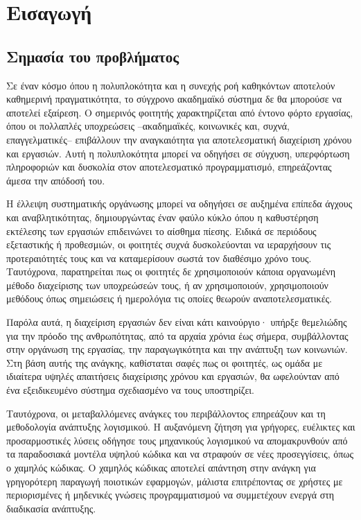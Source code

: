 \chapter{Εισαγωγή}
	\section{Σημασία του προβλήματος}
		Σε έναν κόσμο όπου η πολυπλοκότητα και η συνεχής ροή καθηκόντων αποτελούν καθημερινή πραγματικότητα, το σύγχρονο ακαδημαϊκό σύστημα δε θα μπορούσε να αποτελεί εξαίρεση. Ο σημερινός φοιτητής χαρακτηρίζεται από έντονο φόρτο εργασίας, όπου οι πολλαπλές υποχρεώσεις --ακαδημαϊκές, κοινωνικές και, συχνά, επαγγελματικές-- επιβάλλουν την αναγκαιότητα για αποτελεσματική διαχείριση χρόνου και εργασιών. Αυτή η πολυπλοκότητα μπορεί να οδηγήσει σε σύγχυση, υπερφόρτωση πληροφοριών και δυσκολία στον αποτελεσματικό προγραμματισμό, επηρεάζοντας άμεσα την απόδοσή του.

		Η έλλειψη συστηματικής οργάνωσης μπορεί να οδηγήσει σε αυξημένα επίπεδα άγχους και αναβλητικότητας, δημιουργώντας έναν φαύλο κύκλο όπου η καθυστέρηση εκτέλεσης των εργασιών επιδεινώνει το αίσθημα πίεσης. Ειδικά σε περιόδους εξεταστικής ή προθεσμιών, οι φοιτητές συχνά δυσκολεύονται να ιεραρχήσουν τις προτεραιότητές τους και να καταμερίσουν σωστά τον διαθέσιμο χρόνο τους. Ταυτόχρονα, παρατηρείται πως οι φοιτητές δε χρησιμοποιούν κάποια οργανωμένη μέθοδο διαχείρισης των υποχρεώσεών τους, ή αν χρησιμοποιούν, χρησιμοποιούν μεθόδους όπως σημειώσεις ή ημερολόγια τις οποίες θεωρούν αναποτελεσματικές.

		Παρόλα αυτά, η διαχείριση εργασιών δεν είναι κάτι καινούργιο· υπήρξε θεμελιώδης για την πρόοδο της ανθρωπότητας, από τα αρχαία χρόνια έως σήμερα, συμβάλλοντας στην οργάνωση της εργασίας, την παραγωγικότητα και την ανάπτυξη των κοινωνιών. Στη βάση αυτής της ανάγκης, καθίσταται σαφές πως οι φοιτητές, ως ομάδα με ιδιαίτερα υψηλές απαιτήσεις διαχείρισης χρόνου και εργασιών, θα ωφελούνταν από ένα εξειδικευμένο σύστημα σχεδιασμένο να τους υποστηρίζει.

		Ταυτόχρονα, οι μεταβαλλόμενες ανάγκες του περιβάλλοντος επηρεάζουν και τη μεθοδολογία ανάπτυξης λογισμικού. Η αυξανόμενη ζήτηση για γρήγορες, ευέλικτες και προσαρμοστικές λύσεις οδήγησε τους μηχανικούς λογισμικού να απομακρυνθούν από τα παραδοσιακά μοντέλα υψηλού κώδικα και να στραφούν σε νέες προσεγγίσεις, όπως ο χαμηλός κώδικας. Ο χαμηλός κώδικας αποτελεί απάντηση στην ανάγκη για γρηγορότερη παραγωγή ποιοτικών εφαρμογών, μάλιστα επιτρέποντας σε χρήστες με περιορισμένες ή μηδενικές γνώσεις προγραμματισμού να συμμετέχουν ενεργά στη διαδικασία ανάπτυξης.

